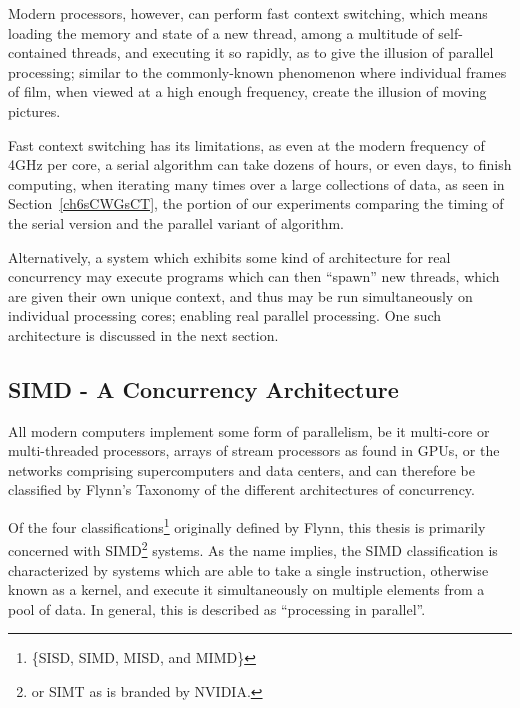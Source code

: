 Modern processors, however, can perform fast context switching, which means loading the memory and state of a new thread, among a multitude of self-contained threads, and executing it so rapidly, as to give the illusion of parallel processing; similar to the commonly-known phenomenon where individual frames of film, when viewed at a high enough frequency, create the illusion of moving pictures.

Fast context switching has its limitations, as even at the modern frequency of 4GHz per core, a serial algorithm can take dozens of hours, or even days, to finish computing, when iterating many times over a large collections of data, as seen in Section~\ref{ch6sCWGsCT}, the portion of our experiments comparing the timing of the serial version and the parallel variant of  algorithm.

Alternatively, a system which exhibits some kind of architecture for real concurrency may execute programs which can then ``spawn'' new threads, which are given their own unique context, and thus may be run simultaneously on individual processing cores; enabling real parallel processing. One such architecture is discussed in the next section.

%
%
%
%
\subsection{SIMD - A Concurrency Architecture}
\label{ch2sPPssSACA}
All modern computers implement some form of parallelism, be it multi-core or multi-threaded processors, arrays of stream processors as found in GPUs, or the networks comprising supercomputers and data centers, and can therefore be classified by Flynn's Taxonomy of the different architectures of concurrency.

Of the four classifications\footnote{\{SISD, SIMD, MISD, and MIMD\}} originally defined by Flynn, this thesis is primarily concerned with \gls{SIMD}\footnote{or SIMT as is branded by NVIDIA.} systems. As the name implies, the \gls{SIMD} classification is characterized by systems which are able to take a single instruction, otherwise known as a \gls{kernel}, and execute it simultaneously on multiple elements from a pool of data. In general, this is described as ``processing in parallel''.

